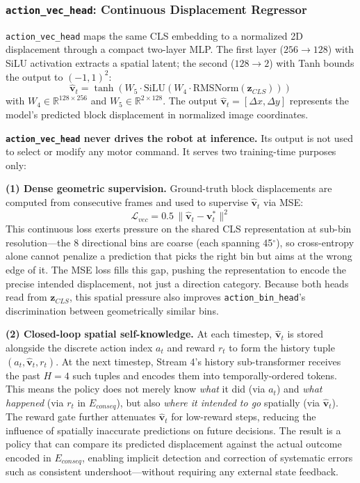 \documentclass[letterpaper]{article} %
\begin{document}
\subsubsection{\texttt{action\_vec\_head}: Continuous Displacement Regressor}

\texttt{action\_vec\_head} maps the same CLS embedding to a normalized 2D displacement through a compact two-layer MLP. The first layer ($256 \to 128$) with SiLU activation extracts a spatial latent; the second ($128 \to 2$) with Tanh bounds the output to $(-1,1)^2$:
\begin{equation}
\hat{\mathbf{v}}_t = \tanh\!\left(W_5 \cdot \mathrm{SiLU}\!\left(W_4 \cdot \mathrm{RMSNorm}(\mathbf{z}_{CLS})\right)\right)
\end{equation}
with $W_4 \in \mathbb{R}^{128 \times 256}$ and $W_5 \in \mathbb{R}^{2 \times 128}$. The output $\hat{\mathbf{v}}_t = [\Delta x, \Delta y]$ represents the model's predicted block displacement in normalized image coordinates.

\textbf{\texttt{action\_vec\_head} never drives the robot at inference.} Its output is not used to select or modify any motor command. It serves two training-time purposes only:

\textbf{(1) Dense geometric supervision.} Ground-truth block displacements are computed from consecutive frames and used to supervise $\hat{\mathbf{v}}_t$ via MSE:
\begin{equation}
\mathcal{L}_{vec} = 0.5\,\|\hat{\mathbf{v}}_t - \mathbf{v}^*_t\|^2
\end{equation}
This continuous loss exerts pressure on the shared CLS representation at sub-bin resolution---the 8 directional bins are coarse (each spanning 45$^\circ$), so cross-entropy alone cannot penalize a prediction that picks the right bin but aims at the wrong edge of it. The MSE loss fills this gap, pushing the representation to encode the precise intended displacement, not just a direction category. Because both heads read from $\mathbf{z}_{CLS}$, this spatial pressure also improves \texttt{action\_bin\_head}'s discrimination between geometrically similar bins.

\textbf{(2) Closed-loop spatial self-knowledge.} At each timestep, $\hat{\mathbf{v}}_t$ is stored alongside the discrete action index $a_t$ and reward $r_t$ to form the history tuple $(a_t, \hat{\mathbf{v}}_t, r_t)$. At the next timestep, Stream 4's history sub-transformer receives the past $H{=}4$ such tuples and encodes them into temporally-ordered tokens. This means the policy does not merely know \emph{what} it did (via $a_t$) and \emph{what happened} (via $r_t$ in $E_{conseq}$), but also \emph{where it intended to go} spatially (via $\hat{\mathbf{v}}_t$). The reward gate further attenuates $\hat{\mathbf{v}}_t$ for low-reward steps, reducing the influence of spatially inaccurate predictions on future decisions. The result is a policy that can compare its predicted displacement against the actual outcome encoded in $E_{conseq}$, enabling implicit detection and correction of systematic errors such as consistent undershoot---without requiring any external state feedback.
\end{document}
